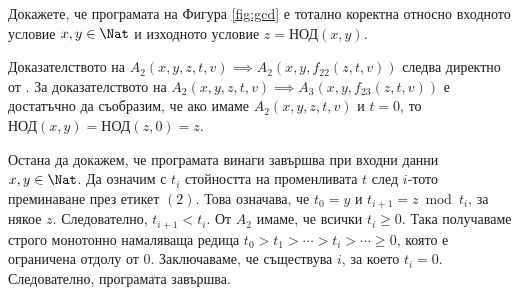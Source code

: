 \begin{prop}
  Докажете, че програмата на Фигура \ref{fig:gcd} е тотално коректна относно входното условие $x,y\in\Nat$
  и изходното условие $z = \text{НОД}(x,y)$.
\end{prop}
\begin{hint}
  Доказателството на $A_2(x,y,z,t,v) \implies A_2(x,y,f_{22}(z,t,v))$ следва директно от .
  За доказателството на $A_2(x,y,z,t,v) \implies A_3(x,y,f_{23}(z,t,v))$ е достатъчно да съобразим, че ако имаме $A_2(x,y,z,t,v)$ и $t = 0$, то
  $\text{НОД}(x,y) = \text{НОД}(z,0) = z$.
  
  Остана да докажем, че програмата винаги завършва при входни данни $x,y \in \Nat$.
  Да означим с $t_i$ стойността на променливата $t$ след $i$-тото преминаване през етикет $(2)$.
  Това означава, че $t_0 = y$ и $t_{i+1} = z \bmod t_i$, за някое $z$.
  Следователно, $t_{i+1} < t_i$. От $A_2$ имаме, че всички $t_i \geq 0$.
  Така получаваме строго монотонно намаляваща редица $t_0 > t_1 > \cdots > t_i > \cdots \geq 0$, която е ограничена отдолу от $0$.
  Заключаваме, че съществува $i$, за което $t_i = 0$. Следователно, програмата завършва.
\end{hint}


